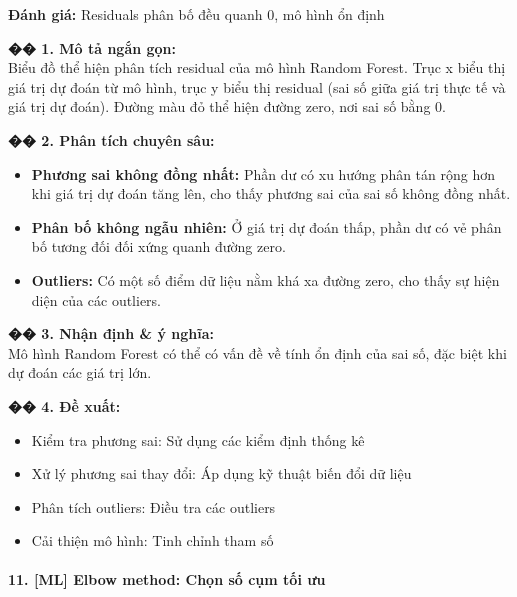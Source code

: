 \documentclass[12pt,a4paper]{article}
\begin{document}
\begin{aibox}
\textbf{Đánh giá:} Residuals phân bố đều quanh 0, mô hình ổn định

\textbf{�� 1. Mô tả ngắn gọn:}\\
Biểu đồ thể hiện phân tích residual của mô hình Random Forest. Trục x biểu thị giá trị dự đoán từ mô hình, trục y biểu thị residual (sai số giữa giá trị thực tế và giá trị dự đoán). Đường màu đỏ thể hiện đường zero, nơi sai số bằng 0.

\textbf{�� 2. Phân tích chuyên sâu:}
\begin{itemize}
    \item \textbf{Phương sai không đồng nhất:} Phần dư có xu hướng phân tán rộng hơn khi giá trị dự đoán tăng lên, cho thấy phương sai của sai số không đồng nhất.
    \item \textbf{Phân bố không ngẫu nhiên:} Ở giá trị dự đoán thấp, phần dư có vẻ phân bố tương đối đối xứng quanh đường zero.
    \item \textbf{Outliers:} Có một số điểm dữ liệu nằm khá xa đường zero, cho thấy sự hiện diện của các outliers.
\end{itemize}

\textbf{�� 3. Nhận định \& ý nghĩa:}\\
Mô hình Random Forest có thể có vấn đề về tính ổn định của sai số, đặc biệt khi dự đoán các giá trị lớn.

\textbf{�� 4. Đề xuất:}
\begin{itemize}
    \item Kiểm tra phương sai: Sử dụng các kiểm định thống kê
    \item Xử lý phương sai thay đổi: Áp dụng kỹ thuật biến đổi dữ liệu
    \item Phân tích outliers: Điều tra các outliers
    \item Cải thiện mô hình: Tinh chỉnh tham số
\end{itemize}
\end{aibox}

\paragraph{11. [ML] Elbow method: Chọn số cụm tối ưu}
\end{document}
